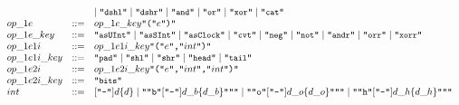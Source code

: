 \begin{figure}[htbp]
{\[\begin{array}{l l l}
& &   \mid \mbox{\tt ``\prettyll{dshl}''}  \mid \mbox{\tt ``\prettyll{dshr}''} \mid \mbox{\tt ``\prettyll{and}''} \mid \mbox{\tt ``\prettyll{or}''} \mid \mbox{\tt ``\prettyll{xor}''} \mid \mbox{\tt ``\prettyll{cat}''} \\
op\_1e & ::= & op\_1e\_key \mbox{\tt ``(''}  e \mbox{\tt ``)''} \\
op\_1e\_key & ::= & \mbox{\tt ``\prettyll{asUInt}''} \mid \mbox{\tt ``\prettyll{asSInt}''} \mid \mbox{\tt ``\prettyll{asClock}''} \mid \mbox{\tt ``\prettyll{cvt}''} \mid \mbox{\tt ``\prettyll{neg}''} \mid \mbox{\tt ``\prettyll{not}''}  \mid \mbox{\tt ``\prettyll{andr}''} \mid \mbox{\tt ``\prettyll{orr}''} \mid  \mbox{\tt ``\prettyll{xorr}''}\\
%
op\_1e1i & ::= & op\_1e1i\_key \mbox{\tt ``(''}  e \mbox{\tt ``,''} int \mbox{\tt ``)''} \\
op\_1e1i\_key & ::= & \mbox{\tt ``\prettyll{pad}''} \mid \mbox{\tt ``\prettyll{shl}''} \mid \mbox{\tt ``\prettyll{shr}''} \mid \mbox{\tt ``\prettyll{head}''} \mid \mbox{\tt ``\prettyll{tail}''} \\
op\_1e2i & ::= & op\_1e2i\_key \mbox{\tt ``(''}  e \mbox{\tt ``,''}  int  \mbox{\tt ``,''}  int \mbox{\tt ``)''} \\
op\_1e2i\_key & ::= & \mbox{\tt ``\prettyll{bits}''}\\
%
int & ::= & [\mbox{\tt ``-''}] d \{d\} \mid \mbox{\tt ``"b''} [\mbox{\tt ``-''}] d\_b \{d\_b\} \mbox{\tt ``"''}
 \mid \mbox{\tt ``"o''} [\mbox{\tt ``-''}] d\_o \{d\_o\} \mbox{\tt ``"''} \mid
\mbox{\tt ``"h''} [\mbox{\tt ``-''}] d\_h \{d\_h\} \mbox{\tt ``"''} \\
%
%


\end{array}\]}
\end{figure}

